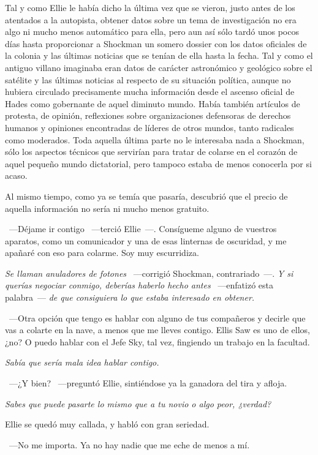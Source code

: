 Tal y como Ellie le había dicho la última vez que se vieron, justo antes de los atentados a la autopista, obtener datos sobre un tema de investigación no era algo ni mucho menos automático para ella, pero aun así sólo tardó unos pocos días hasta proporcionar a Shockman un somero dossier con los datos oficiales de la colonia y las últimas noticias que se tenían de ella hasta la fecha. Tal y como el antiguo villano imaginaba eran datos de carácter astronómico y geológico sobre el satélite y las últimas noticias al respecto de su situación política, aunque no hubiera circulado precisamente mucha información desde el ascenso oficial de Hades como gobernante de aquel diminuto mundo. Había también artículos de protesta, de opinión, reflexiones sobre organizaciones defensoras de derechos humanos y opiniones encontradas de líderes de otros mundos, tanto radicales como moderados. Toda aquella última parte no le interesaba nada a Shockman, sólo los aspectos técnicos que servirían para tratar de colarse en el corazón de aquel pequeño mundo dictatorial, pero tampoco estaba de menos conocerla por si acaso.

Al mismo tiempo, como ya se temía que pasaría, descubrió que el precio de aquella información no sería ni mucho menos gratuito.

~---Déjame ir contigo ~---terció Ellie~---. Consígueme alguno de vuestros aparatos, como un comunicador y una de esas linternas de oscuridad, y me apañaré con eso para colarme. Soy muy escurridiza.

\emph{Se llaman anuladores de fotones} ~---corrigió Shockman, contrariado~---. \emph{Y si querías negociar conmigo, deberías haberlo hecho antes} ~---enfatizó esta palabra~--- \emph{de que consiguiera lo que estaba interesado en obtener.}

~---Otra opción que tengo es hablar con alguno de tus compañeros y decirle que vas a colarte en la nave, a menos que me lleves contigo. Ellis Saw es uno de ellos, ¿no? O puedo hablar con el Jefe Sky, tal vez, fingiendo un trabajo en la facultad.

\emph{Sabía que sería mala idea hablar contigo.}

~---¿Y bien? ~---preguntó Ellie, sintiéndose ya la ganadora del tira y afloja.

\emph{Sabes que puede pasarte lo mismo que a tu novio o algo peor, ¿verdad?}

Ellie se quedó muy callada, y habló con gran seriedad.

~---No me importa. Ya no hay nadie que me eche de menos a mí.

